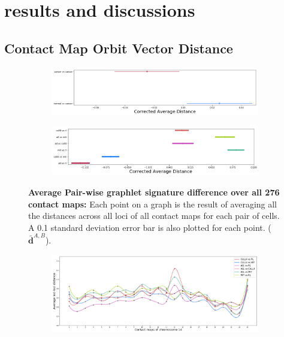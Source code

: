 \documentclass[a4,center,fleqn]{NAR}
\begin{document}
\section{results and discussions}
\subsection{Contact Map Orbit Vector Distance}
\begin{figure}
    \centering
    \begin{subfigure}[b]{.5\textwidth}
        \includegraphics[width=\textwidth]{figures/orbit_distances_normal_vs_cancer.png}
        \caption{}
        \label{fig:orbit_distances_all_a}
    \end{subfigure}

    \begin{subfigure}[b]{.5\textwidth}
        \includegraphics[width=\textwidth]{figures/orbit_distances_cells.png}
        \caption{}
        \label{fig:orbit_distances_all_b}
    \end{subfigure}

    \caption{   
        \textbf{Average Pair-wise graphlet signature difference 
        over all 276 contact maps:}
        Each point on a graph is the result of averaging all
        the distances across all loci of all contact maps for 
        each pair of cells. A 0.1 standard deviation error
        bar is also plotted for each point.
        ($\bar{\mathbf{d}}^{\scriptscriptstyle A,B}$).  
     }
    \label{fig:orbit_distances_all}
\end{figure}

\begin{figure}
    \centering
    \begin{subfigure}[b]{.5\textwidth}
        \includegraphics[width=\textwidth]{figures/orbit-distances_chr14.png}
    \end{subfigure}
    \caption{   
     }
    \label{fig:orbit_distances_chr14}
\end{figure}
\end{document}

